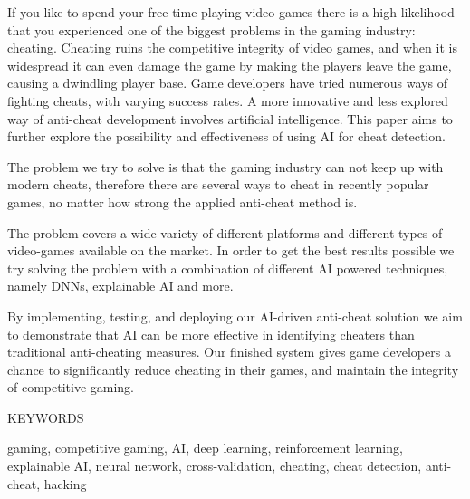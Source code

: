 \label{ch:abstract}

If you like to spend your free time playing video games there is a high likelihood that you
experienced one of the biggest problems in the gaming industry: cheating. Cheating ruins the
competitive integrity of video games, and when it is widespread it can even damage the game by
making the players leave the game, causing a dwindling player base. Game developers have
tried numerous ways of fighting cheats, with varying success rates. A more innovative and less
explored way of anti-cheat development involves artificial intelligence. This paper aims to further explore the possibility
and effectiveness of using AI for cheat detection.

The problem we try to solve is that the gaming industry can not keep up with modern cheats, therefore there are several ways to cheat in recently popular games, no matter how strong the applied anti-cheat method is.

The problem covers a wide variety of different platforms and different types of video-games available on the market.
In order to get the best results possible we try solving the problem with a combination of different AI powered techniques, namely DNNs, explainable AI and more.

By implementing, testing, and deploying our AI-driven anti-cheat solution we aim to
demonstrate that AI can be more effective in identifying cheaters than traditional anti-cheating
measures. Our finished system gives game developers a chance to significantly reduce cheating
in their games, and maintain the integrity of competitive gaming.

\begin{center}
  KEYWORDS

  gaming, competitive gaming, AI, deep learning, reinforcement learning, explainable AI, neural network, cross-validation, cheating, cheat detection, anti-cheat, hacking
\end{center}
